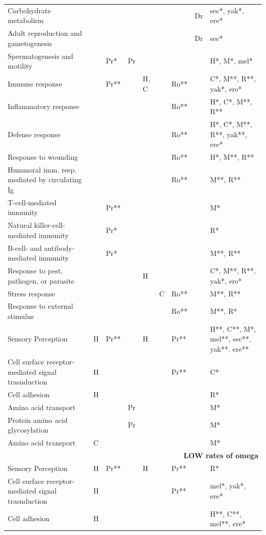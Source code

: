 \begin{FPtable}
{\begin{tabular}{ p{8.5cm} p{0.8cm} p{0.8cm} p{0.5cm} p{0.8cm} p{0.5cm} p{0.85cm} p{0.5cm} p{8cm}}
  Carbohydrate metabolism &  &  &  &  &  &  & Dr & sec*, yak*, ere* \\
  Adult reproduction and gametogenesis &  &  &  &  &  &  & Dr & sec* \\
  Spermatogenesis and motility &  & Pr* & Pr &  &  &  &  & H*, M*, mel* \\
  Immune response &  & Pr** &  & H, C &  & Ro** &  & C*, M**, R**, yak*, ere* \\
  Inflammatory response &  &  &  &  &  & Ro** &  & H*, C*, M**, R** \\
  Defense response &  &  &  &  &  & Ro** &  & H*, C*, M**, R**, yak**, ere* \\
  Response to wounding &  &  &  &  &  & Ro** &  & H*, M**, R** \\
  Hummoral imm. resp. mediated by circulating Ig &  &  &  &  &  & Ro** &  & M**, R** \\
  T-cell-mediated immunity &  & Pr** &  &  &  &  &  & M* \\
  Natural killer-cell-mediated immunity &  & Pr* &  &  &  &  &  & R* \\
  B-cell- and antibody-mediated immunity &  & Pr* &  &  &  &  &  & M**, R** \\
  Response to pest, pathogen, or parasite &  &  &  & H &  &  &  & C*, M**, R**, yak*, ere* \\
  Stress response &  &  &  &  & C & Ro** &  & M**, R** \\
  Response to external stimulus &  &  &  &  &  & Ro** &  & M**, R* \\
  Sensory Perception & H & Pr** &  & H &  & Pr** &  & H**, C**, M*, mel**, sec**, yak**. ere** \\
  Cell surface receptor-mediated signal trasnduction & H &  &  &  &  & Pr** &  & C* \\
  Cell adhesion & H &  &  &  &  &  &  & R* \\
  Amino acid transport &  &  & Pr &  &  &  &  & M* \\
  Protein amino acid glycosylation &  &  & Pr &  &  &  &  & M* \\
  Amino acid transport & C &  &  &  &  &  &  & M* \\ \hline
  \multicolumn{9}{r}{\textbf{LOW rates of omega}} \\ \hline
  Sensory Perception & H & Pr** &  & H &  & Pr** &  & R* \\
  Cell surface receptor-mediated signal trasnduction & H &  &  &  &  & Pr** &  & mel*, yak*, ere* \\
  Cell adhesion & H &  &  &  &  &  &  & H**, C**, mel**, ere* \\

\end{tabular}}
\end{FPtable}
